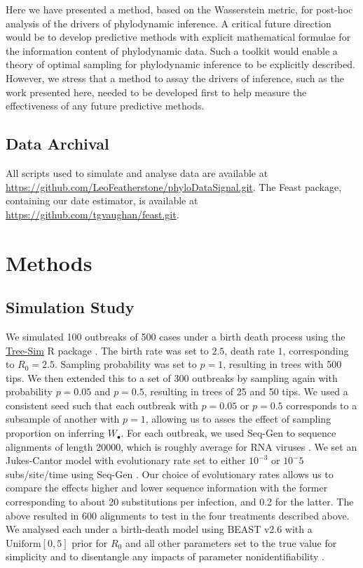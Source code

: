 \documentclass{article}
\begin{document}
Here we have presented a method, based on the Wasserstein metric, for post-hoc analysis of the drivers of phylodynamic inference. A critical future direction would be to develop predictive methods with explicit mathematical formulae for the information content of phylodynamic data. Such a toolkit would enable a theory of optimal sampling for phylodynamic inference to be explicitly described. However, we stress that a method to assay the drivers of inference, such as the work presented here, needed to be developed first to help measure the effectiveness of any future predictive methods. 
    
\subsection*{Data Archival}
All scripts used to simulate and analyse data are available at \url{https://github.com/LeoFeatherstone/phyloDataSignal.git}. The Feast package, containing our date estimator, is available at \url{https://github.com/tgvaughan/feast.git}.
\section*{Methods}
\subsection*{Simulation Study}
We simulated 100 outbreaks of 500 cases under a birth death process using the \url{Tree-Sim} R package \citep{TreeSim}. The birth rate was set to $2.5$, death rate $1$, corresponding to $R_{0} = 2.5$. Sampling probability was set to $p=1$, resulting in trees with 500 tips. We then extended this to a set of 300 outbreaks by sampling again with probability $p=0.05$ and $p = 0.5$, resulting in trees of 25 and 50 tips. We used a consistent seed such that each outbreak with $p=0.05$ or $p=0.5$ corresponds to a subsample of another with $p=1$, allowing us to asses the effect of sampling proportion on inferring $W_{\bullet}$. For each outbreak, we used Seq-Gen to sequence alignments of length 20000, which is roughly average for RNA viruses \citep{sanjuan2010viral,rambaut_seq-gen_1997}. We set an Jukes-Cantor model with evolutionary rate set to either $10^{-3}$ or $10^-{5}$ subs/site/time using Seq-Gen \cite{rambaut_seq-gen_1997}.  Our choice of evolutionary rates allows us to compare the effects higher and lower sequence information with the former corresponding to about 20 substitutions per infection, and 0.2 for the latter. 
The above resulted in 600 alignments to test in the four treatments described above. We analysed each under a birth-death model using BEAST v2.6 \citet{bouckaert_beast_2019} with a $\textrm{Uniform}[0,5]$ prior for $R_0$ and all other parameters set to the true value for simplicity and to disentangle any impacts of parameter nonidentifiability \citep{louca2021fundamental}.
\end{document}

